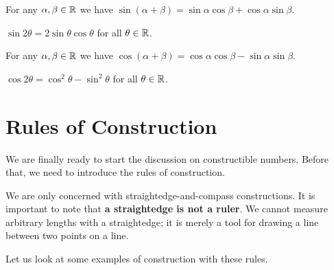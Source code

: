 \begin{theorem}\label{thrm-sine-sum-rule}
    For any $\alpha,\beta \in \mathbb{R}$ we have $\sin(\alpha+\beta) = \sin\alpha\cos\beta + \cos\alpha\sin\beta$.
\end{theorem}
\begin{corollary}
    $\sin2\theta = 2\sin\theta\cos\theta$ for all $\theta \in \mathbb{R}$.
\end{corollary}

\begin{theorem}\label{thrm-cosine-sum-rule}
    For any $\alpha,\beta \in \mathbb{R}$ we have $\cos(\alpha+\beta) = \cos\alpha\cos\beta - \sin\alpha\sin\beta$.
\end{theorem}
\begin{corollary}
    $\cos2\theta = \cos^2\theta - \sin^2\theta$ for all $\theta \in \mathbb{R}$.
\end{corollary}

\section{Rules of Construction}
We are finally ready to start the discussion on constructible numbers. Before that, we need to introduce the rules of construction.

We are only concerned with straightedge-and-compass constructions. It is important to note that \textbf{a straightedge is not a ruler}. We cannot measure arbitrary lengths with a straightedge; it is merely a tool for drawing a line between two points on a line.

Let us look at some examples of construction with these rules.

